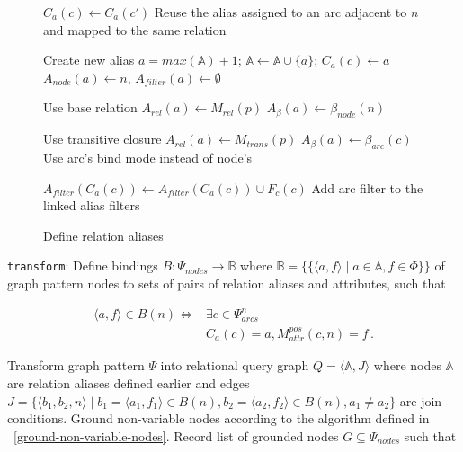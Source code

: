 \documentclass[conference,letterpaper]{IEEEtran}
\begin{document}
\begin{figure}
\begin{algorithmic}[1]


      \State $C_a(c) \gets C_a(c')$
      \Comment Reuse the alias assigned to an arc adjacent to $n$ and
      mapped to the same relation

    \Else
      \Comment Create new alias
      \State $a = max(\mathbb{A}) + 1$;
        $\mathbb{A} \gets \mathbb{A} \cup \{ a\}$;
        $C_a(c) \gets a$
      \State $A_{node}(a) \gets n$, $A_{filter}(a) \gets \emptyset$

        \Comment Use base relation
        \State $A_{rel}(a) \gets M_{rel}(p)$
        \State $A_\beta(a) \gets \beta_{node}(n)$

      \Else
        \Comment Use transitive closure
        \State $A_{rel}(a) \gets M_{trans}(p)$
        \State $A_\beta(a) \gets \beta_{arc}(c)$
        \State \Comment Use arc's bind mode instead of node's
      \EndIf
    \EndIf
  \EndFor
\EndFor

  \State $A_{filter}( C_a(c) ) \gets A_{filter}( C_a(c) ) \cup F_c(c)$
  \State \Comment Add arc filter to the linked alias filters
\EndFor

\end{algorithmic}
\caption{Define relation aliases}
\label{define-relation-aliases}
\end{figure}

{\tt transform}: Define bindings $B: \Psi_{nodes} \to \mathbb{B}$ where
$\mathbb{B} = \{\{ \langle a, f \rangle \mid a \in \mathbb{A}, f \in
\Phi \}\}$ of graph pattern nodes to sets of pairs of relation aliases
and attributes, such that

\begin{equation}
\begin{split}
\langle a, f \rangle \in B(n) \iff
  &\exists c \in \Psi_{arcs}^n \\
  &C_a(c) = a, M_{attr}^{pos}(c, n) = f \, .
\end{split}
\end{equation}

Transform graph pattern $\Psi$ into relational query graph $Q = \langle
\mathbb{A}, J \rangle$ where nodes $\mathbb{A}$ are relation aliases
defined earlier and edges $J = \{ \langle b_1, b_2, n \rangle \mid b_1 =
\langle a_1, f_1 \rangle \in B(n), b_2 = \langle a_2, f_2 \rangle \in
B(n), a_1 \not= a_2 \}$ are join conditions. Ground non-variable nodes
according to the algorithm defined in
\figurename~\ref{ground-non-variable-nodes}. Record list of grounded nodes $G
\subseteq \Psi_{nodes}$ such that
\end{document}
